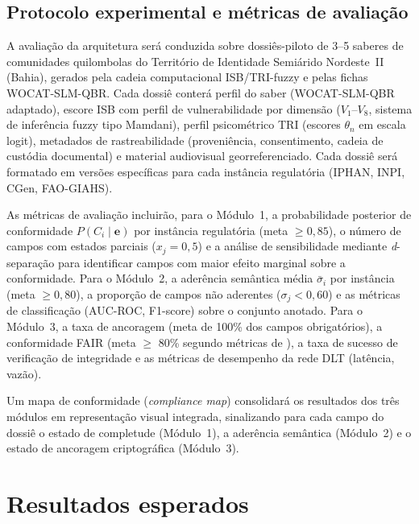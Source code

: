 \documentclass[preprint,12pt,authoryear]{elsarticle}
\begin{document}
\subsection{Protocolo experimental e métricas de avaliação}
\label{subsec:protocol}

A avaliação da arquitetura será conduzida sobre dossiês-piloto de 3--5 saberes de comunidades quilombolas do Território de Identidade Semiárido Nordeste~II (Bahia), gerados pela cadeia computacional ISB/TRI-fuzzy e pelas fichas WOCAT-SLM-QBR. Cada dossiê conterá perfil do saber (WOCAT-SLM-QBR adaptado), escore ISB com perfil de vulnerabilidade por dimensão ($V_1$--$V_8$, sistema de inferência fuzzy tipo Mamdani), perfil psicométrico TRI (escores $\theta_n$ em escala logit), metadados de rastreabilidade (proveniência, consentimento, cadeia de custódia documental) e material audiovisual georreferenciado. Cada dossiê será formatado em versões específicas para cada instância regulatória (IPHAN, INPI, CGen, FAO-GIAHS).

As métricas de avaliação incluirão, para o Módulo~1, a probabilidade posterior de conformidade $P(C_i \mid \mathbf{e})$ por instância regulatória (meta $\geq 0{,}85$), o número de campos com estados parciais ($x_j = 0{,}5$) e a análise de sensibilidade mediante \textit{d}-separação para identificar campos com maior efeito marginal sobre a conformidade. Para o Módulo~2, a aderência semântica média $\bar{\sigma}_i$ por instância (meta $\geq 0{,}80$), a proporção de campos não aderentes ($\sigma_j < 0{,}60$) e as métricas de classificação (AUC-ROC, F1-score) sobre o conjunto anotado. Para o Módulo~3, a taxa de ancoragem (meta de 100\% dos campos obrigatórios), a conformidade FAIR (meta $\geq$ 80\% segundo métricas de \citealt{Wilkinson2016}), a taxa de sucesso de verificação de integridade e as métricas de desempenho da rede DLT (latência, vazão).

Um mapa de conformidade (\textit{compliance map}) consolidará os resultados dos três módulos em representação visual integrada, sinalizando para cada campo do dossiê o estado de completude (Módulo~1), a aderência semântica (Módulo~2) e o estado de ancoragem criptográfica (Módulo~3).


\section{Resultados esperados}
\label{sec:results}
\end{document}
